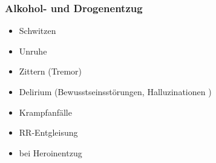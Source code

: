% 
% 
% 
% 
% 
% 
% 
% 
% 
% 
% 
% 
% 
% 
% 
% 
% 
% 
% 
% 
% 
% 
% 
% 
% 
% 



\subsubsection{Alkohol- und Drogenentzug}
\label{topic:alkohol-entzug}


{%
\begin{itemize}
  \item Schwitzen
  \item Unruhe
  \item Zittern (Tremor)
  \item Delirium  (Bewusstseinsstörungen, Halluzinationen )
  \item Krampfanfälle
  \item RR-Entgleisung
  \item {} bei Heroinentzug
\end{itemize}
}{

}{}{}{}

